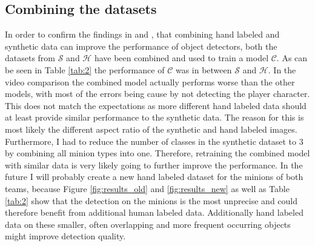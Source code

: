 \subsection{Combining the datasets}
In order to confirm the findings in \cite{rajpura2017object} and \cite{prakash2018structured}, that combining hand labeled and synthetic data can improve the performance of object detectors, both the datasets from $\mathcal{S}$ and $\mathcal{H}$ have been combined and used to train a model $\mathcal{C}$.
As can be seen in Table \ref{tab:2} the performance of $\mathcal{C}$ was in between $\mathcal{S}$ and $\mathcal{H}$.
In the video comparison the combined model actually performs worse than the other models, with most of the errors being cause by not detecting the player character.
This does not match the expectations as more different hand labeled data should at least provide similar performance to the synthetic data.
The reason for this is most likely the different aspect ratio of the synthetic and hand labeled images.
Furthermore, I had to reduce the number of classes in the synthetic dataset to 3 by combining all minion types into one.
Therefore, retraining the combined model with similar data is very likely going to further improve the performance.
In the future I will probably create a new hand labeled dataset for the minions of both teams, because Figure \ref{fig:results_old} and \ref{fig:results_new} as well as Table \ref{tab:2} show that the detection on the minions is the most unprecise and could therefore benefit from additional human labeled data.
Additionally hand labeled data on these smaller, often overlapping and more frequent occurring objects might improve detection quality.

